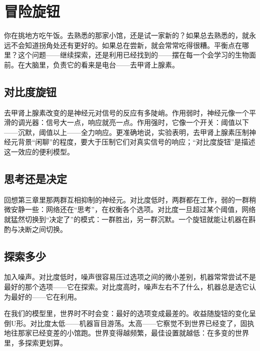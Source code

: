 \chapter{冒险旋钮}

你在挑地方吃午饭。去熟悉的那家小馆，还是试一家新的？如果总去熟悉的，就永远不会知道拐角处还有更好的。如果总在尝新，就会常常吃得很糟。平衡点在哪里？这个问题——继续探索，还是利用已经找到的——摆在每一个会学习的生物面前。在大脑里，负责它的看来是电台——去甲肾上腺素。

\section*{对比度旋钮}

去甲肾上腺素改变的是神经元对信号的反应有多陡峭。作用弱时，神经元像一个平滑的调光器：信号大一点，响应就亮一点。作用强时，它像一个开关：阈值以下——沉默，阈值以上——全力响应。更准确地说，实验表明，去甲肾上腺素压制神经元背景“闲聊”的程度，要大于压制它们对真实信号的响应；“对比度旋钮”是描述这一效应的便利模型。


\section*{思考还是决定}

回想第三章里那两群互相抑制的神经元。对比度低时，两群都在工作，弱的一群稍微安静一些：网络还在“思考”，在权衡各个选项。对比度一旦超过某个阈值，网络就猛然切换到“决定了”的模式：一群胜出，另一群沉默。一个旋钮就能让机器在斟酌与决断之间切换。

\section*{探索多少}

加入噪声。对比度低时，噪声很容易压过选项之间的微小差别，机器常常尝试不是最好的那个选项——它在探索。对比度高时，噪声左右不了什么，机器总是选它认为最好的——它在利用。

在我们的模型里，世界时不时会变：最好的选项变成最差的。收益随旋钮的变化呈倒U形。对比度太低——机器盲目游荡。太高——它察觉不到世界已经变了，固执地往那家已经变差的小馆跑。世界变得越频繁，最佳设置就越低：在多变的世界里，多探索更划算。

